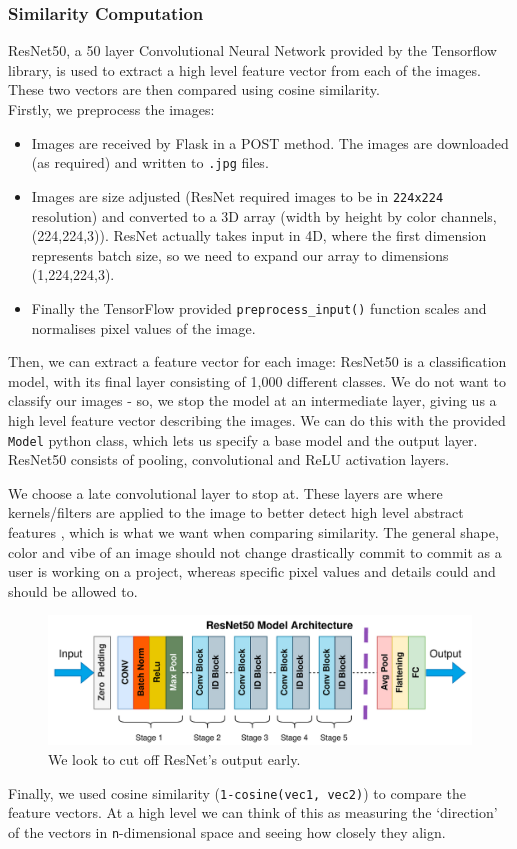 \documentclass[12pt,a4paper]{article}
\begin{document}
\subsubsection{Similarity Computation} ResNet50, a 50 layer Convolutional Neural Network provided by the Tensorflow library, is used to extract a high level feature vector from each of the images. These two vectors are then compared using cosine similarity.\\

Firstly, we preprocess the images:
\begin{itemize}
    \item Images are received by Flask in a POST method. The images are downloaded (as required) and written to \verb|.jpg| files. 
    \item Images are size adjusted (ResNet required images to be in \verb|224x224| resolution) and converted to a 3D array (width by height by color channels, (224,224,3)). ResNet actually takes input in 4D, where the first dimension represents batch size, so we need to expand our array to dimensions (1,224,224,3).
    \item Finally the TensorFlow provided \verb|preprocess_input()| function scales and normalises pixel values of the image.
\end{itemize}
Then, we can extract a feature vector for each image: ResNet50 is a classification model, with its final layer consisting of 1,000 different classes. We do not want to classify our images - so, we stop the model at an intermediate layer, giving us a high level feature vector describing the images. We can do this with the provided \verb|Model| python class, which lets us specify a base model and the output layer. ResNet50 consists of pooling, convolutional and ReLU activation layers. 

We choose a late convolutional layer to stop at. These layers are where kernels/filters are applied to the image to better detect high level abstract features \cite{convNN}, which is what we want when comparing similarity. The general shape, color and vibe of an image should not change drastically commit to commit as a user is working on a project, whereas specific pixel values and details could and should be allowed to.
\begin{figure}[H]
    \centering
    \includegraphics[scale=0.8]{resnet.png}
    \caption{We look to cut off ResNet's output early.}
\end{figure}
Finally, we used cosine similarity (\verb|1-cosine(vec1, vec2)|) to compare the feature vectors. At a high level we can think of this as measuring the `direction' of the vectors in \verb|n|-dimensional space and seeing how closely they align.
\end{document}
